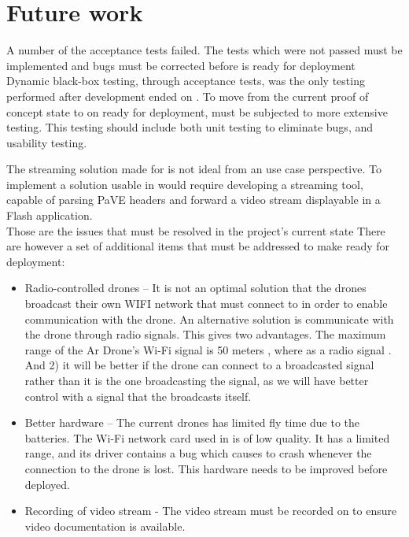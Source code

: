 
\section{Future work}
A number of the acceptance tests failed.
The tests which were not passed must be implemented and bugs must be corrected before \projectname{} is ready for deployment \\

Dynamic black-box testing, through acceptance tests, was the only testing performed after development ended on \projectname{}.
To move from the current proof of concept state to on ready for deployment, \projectname{} must be subjected to more extensive testing.
This testing should include both unit testing to eliminate bugs, and usability testing.

The streaming solution made for \projectname{} is not ideal from an use case perspective.
To implement a solution usable in \projectname{} would require developing a streaming tool, capable of parsing PaVE headers and forward a video stream displayable in a Flash application. \\

Those are the issues that must be resolved in the project's current state
There are however a set of additional items that must be addressed to make \projectname{} ready for deployment:


\begin{itemize}
	\item Radio-controlled drones -- It is not an optimal solution that the drones broadcast their own WIFI network that  must connect to in order to enable communication with the drone. An alternative solution is communicate with the drone through radio signals. This gives two advantages. The maximum range of the Ar Drone's Wi-Fi signal is 50 meters \citep{wifirange}, where as a radio signal . And 2) it will be better if the drone can connect to a broadcasted signal rather than it is the one broadcasting the signal, as we will have better control with a signal that the  broadcasts itself. 
	\item Better hardware -- The current drones has limited fly time due to the batteries. The Wi-Fi network card used in  is of low quality. It has a limited range, and its driver contains a bug which causes  to crash whenever the connection to the drone is lost. This hardware needs to be improved before \projectname{} deployed.
	\item Recording of video stream - The video stream must be recorded on  to ensure video documentation is available.
\end{itemize}

